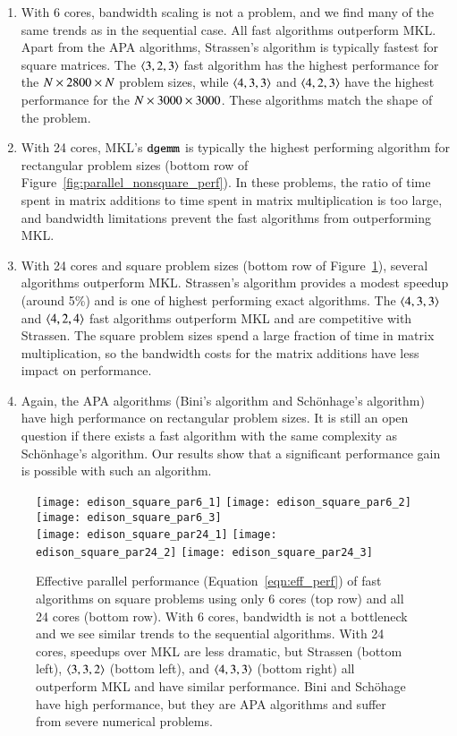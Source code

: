 \documentclass[preprint]{sigplanconf}
\begin{document}
\begin{enumerate}
\item
With 6 cores, bandwidth scaling is not a problem, and we find many of the same trends as in the sequential case.
All fast algorithms outperform MKL.
Apart from the APA algorithms, Strassen's algorithm is typically fastest for square matrices.
The $\left\langle3, 2, 3\right\rangle$ fast algorithm has the highest performance for the $N \times 2800 \times N$ problem sizes, 
while $\left\langle4, 3, 3\right\rangle$ and $\left\langle4, 2, 3\right\rangle$ have the highest performance for the $N \times 3000 \times 3000$.
These algorithms match the shape of the problem.

\item
With 24 cores, MKL's $\texttt{dgemm}$ is typically the highest performing algorithm for rectangular problem sizes (bottom row of Figure~\ref{fig:parallel_nonsquare_perf}).
In these problems, the ratio of time spent in matrix additions to time spent in matrix multiplication is too large, and bandwidth limitations prevent the fast algorithms from outperforming MKL.

\item 
With 24 cores and square problem sizes (bottom row of Figure~\ref{fig:parallel_square_perf}),
several algorithms outperform MKL.
Strassen's algorithm provides a modest speedup (around 5\%) and is one of highest performing exact algorithms.
The $\left\langle4, 3, 3\right\rangle$ and $\left\langle4, 2, 4\right\rangle$ fast algorithms outperform MKL and are competitive with Strassen.
The square problem sizes spend a large fraction of time in matrix multiplication, so the bandwidth costs for the matrix additions have less impact on performance.

\item
Again, the APA algorithms (Bini's algorithm and Sch\"{o}nhage's algorithm) have high performance on rectangular problem sizes.
It is still an open question if there exists a fast algorithm with the same complexity as Sch\"{o}nhage's algorithm.
Our results show that a significant performance gain is possible with such an algorithm.

\end{enumerate}

\begin{figure*}[tb]
\centering
\texttt{[image: edison\_square\_par6\_1]}
\texttt{[image: edison\_square\_par6\_2]}
\texttt{[image: edison\_square\_par6\_3]} \\
\texttt{[image: edison\_square\_par24\_1]}
\texttt{[image: edison\_square\_par24\_2]}
\texttt{[image: edison\_square\_par24\_3]}
\caption{
Effective parallel performance (Equation~\eqref{eqn:eff_perf}) of fast algorithms on square problems using only 6 cores (top row) and all 24 cores (bottom row).
With 6 cores, bandwidth is not a bottleneck and we see similar trends to the sequential algorithms.
With 24 cores, speedups over MKL are less dramatic, but Strassen (bottom left), $\left\langle3, 3, 2\right\rangle$ (bottom left), and $\left\langle4, 3, 3\right\rangle$ (bottom right) all outperform MKL and have similar performance.
Bini and Sch\"{o}hage have high performance, but they are APA algorithms and suffer from severe numerical problems.
}
\label{fig:parallel_square_perf}
\end{figure*}
\end{document}
